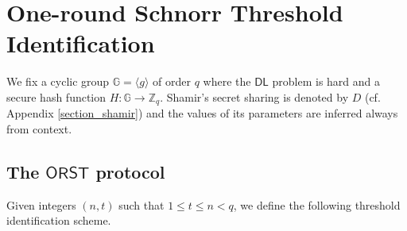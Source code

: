 \documentclass[10pt, psamsfonts, reqno]{amsart}
\theoremstyle{definition}
\theoremstyle{remark}
\numberwithin{equation}{section}
\begin{document}
\section{One-round Schnorr Threshold Identification}\label{section_orst}

\noindent
We fix a cyclic group $\mathbb{G} = \langle g \rangle$ of order $q$
where the $\mathsf{DL}$ problem is hard and
a secure hash function $H: \mathbb{G} \rightarrow \mathbb{Z}_q$.
Shamir's secret sharing is denoted by $D$
(cf. Appendix \ref{section_shamir}) and the values
of its parameters are inferred always from context.

\subsection{The $\mathsf{ORST}$ protocol}

Given integers $(n, t)$ such that $1 \le t \le n < q$,
we define the following threshold identification scheme.
\end{document}
